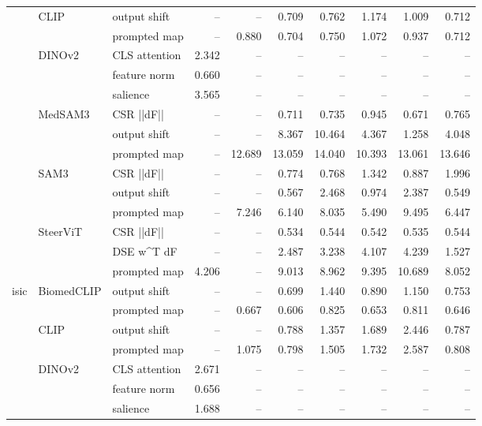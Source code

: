 \begin{tabular}{lllrrrrrrr}
\cline{2-10}
 & \multirow[t]{2}{*}{CLIP} & output shift & -- & -- & 0.709 & 0.762 & 1.174 & 1.009 & 0.712 \\
 &  & prompted map & -- & 0.880 & 0.704 & 0.750 & 1.072 & 0.937 & 0.712 \\
\cline{2-10}
 & \multirow[t]{3}{*}{DINOv2} & CLS attention & 2.342 & -- & -- & -- & -- & -- & -- \\
 &  & feature norm & 0.660 & -- & -- & -- & -- & -- & -- \\
 &  & salience & 3.565 & -- & -- & -- & -- & -- & -- \\
\cline{2-10}
 & \multirow[t]{3}{*}{MedSAM3} & CSR  ||dF|| & -- & -- & 0.711 & 0.735 & 0.945 & 0.671 & 0.765 \\
 &  & output shift & -- & -- & 8.367 & 10.464 & 4.367 & 1.258 & 4.048 \\
 &  & prompted map & -- & 12.689 & 13.059 & 14.040 & 10.393 & 13.061 & 13.646 \\
\cline{2-10}
 & \multirow[t]{3}{*}{SAM3} & CSR  ||dF|| & -- & -- & 0.774 & 0.768 & 1.342 & 0.887 & 1.996 \\
 &  & output shift & -- & -- & 0.567 & 2.468 & 0.974 & 2.387 & 0.549 \\
 &  & prompted map & -- & 7.246 & 6.140 & 8.035 & 5.490 & 9.495 & 6.447 \\
\cline{2-10}
 & \multirow[t]{3}{*}{SteerViT} & CSR  ||dF|| & -- & -- & 0.534 & 0.544 & 0.542 & 0.535 & 0.544 \\
 &  & DSE  w^T dF & -- & -- & 2.487 & 3.238 & 4.107 & 4.239 & 1.527 \\
 &  & prompted map & 4.206 & -- & 9.013 & 8.962 & 9.395 & 10.689 & 8.052 \\
\cline{1-10} \cline{2-10}
\multirow[t]{16}{*}{isic} & \multirow[t]{2}{*}{BiomedCLIP} & output shift & -- & -- & 0.699 & 1.440 & 0.890 & 1.150 & 0.753 \\
 &  & prompted map & -- & 0.667 & 0.606 & 0.825 & 0.653 & 0.811 & 0.646 \\
\cline{2-10}
 & \multirow[t]{2}{*}{CLIP} & output shift & -- & -- & 0.788 & 1.357 & 1.689 & 2.446 & 0.787 \\
 &  & prompted map & -- & 1.075 & 0.798 & 1.505 & 1.732 & 2.587 & 0.808 \\
\cline{2-10}
 & \multirow[t]{3}{*}{DINOv2} & CLS attention & 2.671 & -- & -- & -- & -- & -- & -- \\
 &  & feature norm & 0.656 & -- & -- & -- & -- & -- & -- \\
 &  & salience & 1.688 & -- & -- & -- & -- & -- & -- \\

\end{tabular}
